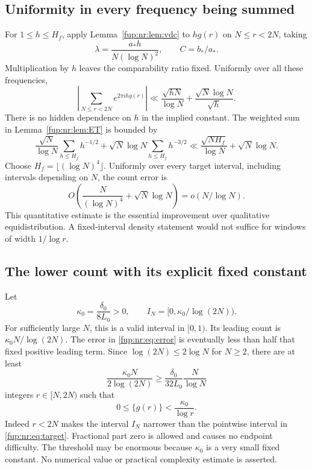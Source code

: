\documentclass[11pt,letterpaper]{article}
\theoremstyle{definition}\newtheorem{definition}[theorem]{Definition}
\theoremstyle{remark}\newtheorem{remark}[theorem]{Remark}
\begin{document}
\subsection{Uniformity in every frequency being summed}
For $1\le h\le H_f$, apply Lemma~\ref{fup:nr:lem:vdc} to $hg(r)$ on $N\le r<2N$, taking
\[
 \lambda=\frac{a_*h}{N(\log N)^2},\qquad C=b_*/a_*.
\]
Multiplication by $h$ leaves the comparability ratio fixed. Uniformly over all these frequencies,
\begin{equation}\label{fup:nr:eq:frequencies}
 \left|\sum_{N\le r<2N}e^{2\pi ihg(r)}\right|
 \ll\frac{\sqrt{hN}}{\log N}+
       \frac{\sqrt N\log N}{\sqrt h}.
\end{equation}
There is no hidden dependence on $h$ in the implied constant. The weighted sum in Lemma~\ref{fup:nr:lem:ET} is bounded by
\[
 \frac{\sqrt N}{\log N}\sum_{h\le H_f}h^{-1/2}
 +\sqrt N\log N\sum_{h\le H_f}h^{-3/2}
 \ll\frac{\sqrt{NH_f}}{\log N}+\sqrt N\log N.
\]
Choose $H_f=\lfloor(\log N)^4\rfloor$. Uniformly over every target interval, including intervals depending on $N$, the count error is
\begin{equation}\label{fup:nr:eq:error}
 O\!\left(\frac N{(\log N)^4}+\sqrt N\log N\right)
 =o(N/\log N).
\end{equation}
This quantitative estimate is the essential improvement over qualitative equidistribution. A fixed-interval density statement would not suffice for windows of width $1/\log r$.

\subsection{The lower count with its explicit fixed constant}
Let
\begin{equation}\label{fup:nr:eq:kappa0}
 \kappa_0=\frac{\delta_0}{8L_0}>0,
 \qquad I_N=[0,\kappa_0/\log(2N)).
\end{equation}
For sufficiently large $N$, this is a valid interval in $[0,1)$. Its leading count is $\kappa_0N/\log(2N)$. The error in \eqref{fup:nr:eq:error} is eventually less than half that fixed positive leading term. Since $\log(2N)\le2\log N$ for $N\ge2$, there are at least
\begin{equation}\label{fup:nr:eq:count}
 \frac{\kappa_0N}{2\log(2N)}\ge
 \frac{\delta_0}{32L_0}\frac N{\log N}
\end{equation}
integers $r\in[N,2N)$ such that
\begin{equation}\label{fup:nr:eq:target}
 0\le\{g(r)\}<\frac{\kappa_0}{\log r}.
\end{equation}
Indeed $r<2N$ makes the interval $I_N$ narrower than the pointwise interval in \eqref{fup:nr:eq:target}. Fractional part zero is allowed and causes no endpoint difficulty. The threshold may be enormous because $\kappa_0$ is a very small fixed constant. No numerical value or practical complexity estimate is asserted.
\end{document}
